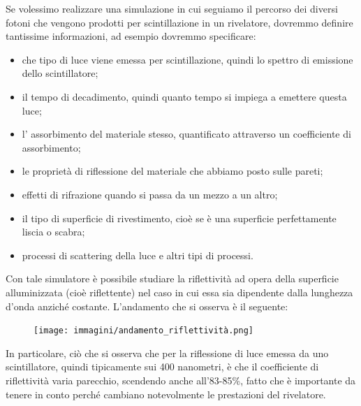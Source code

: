 Se volessimo realizzare una simulazione in cui seguiamo il percorso dei diversi fotoni che vengono prodotti per scintillazione in un rivelatore, dovremmo definire tantissime informazioni, ad esempio dovremmo specificare:

\begin{itemize}
   \item che tipo di luce viene emessa per scintillazione, quindi lo spettro di emissione dello scintillatore;
   \item il tempo di decadimento, quindi quanto tempo si impiega a emettere questa luce;
   \item l' assorbimento del materiale stesso, quantificato attraverso un coefficiente di assorbimento;
   \item le proprietà di riflessione del materiale che abbiamo posto sulle pareti;
   \item effetti di rifrazione quando si passa da un mezzo a un altro;
   \item il tipo di superficie di rivestimento, cioè se è una superficie perfettamente liscia o scabra;
   \item processi di scattering della luce e altri tipi di processi.
\end{itemize}

\begin{esempio}
   Con tale simulatore è possibile studiare la riflettività ad opera della superficie alluminizzata (cioè riflettente) nel caso in cui essa sia dipendente dalla lunghezza d'onda anziché costante. L'andamento che si osserva è il seguente:
   \begin{figure}[H]
      \centering
      \texttt{[image: immagini/andamento\_riflettività.png]}
   \end{figure}
   In particolare, ciò che si osserva che per la riflessione di luce emessa da uno scintillatore, quindi tipicamente sui 400 nanometri, è che il coefficiente di riflettività varia parecchio, scendendo anche all'83-85\%, fatto che è importante da tenere in conto perché cambiano notevolmente le prestazioni del rivelatore.
\end{esempio}

